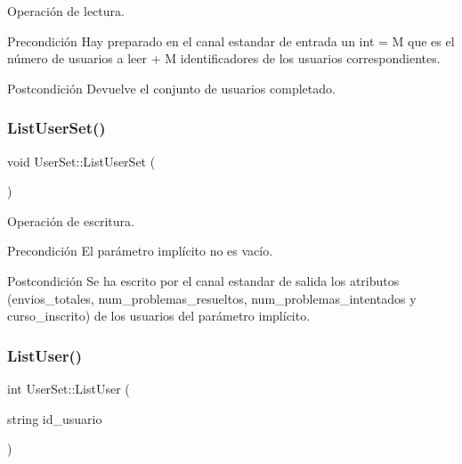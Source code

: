 Operación de lectura. 

\begin{DoxyPrecond}{Precondición}
Hay preparado en el canal estandar de entrada un int = M que es el número de usuarios a leer + M identificadores de los usuarios correspondientes. 
\end{DoxyPrecond}
\begin{DoxyPostcond}{Postcondición}
Devuelve el conjunto de usuarios completado. 
\end{DoxyPostcond}
\mbox{\label{class_user_set_a0d096b2eec4c9b5feb4a1d7c8e6d3ef6}} 
\subsubsection{\texorpdfstring{List\+User\+Set()}{ListUserSet()}}
{\footnotesize\ttfamily void User\+Set\+::\+List\+User\+Set (\begin{DoxyParamCaption}{ }\end{DoxyParamCaption})}



Operación de escritura. 

\begin{DoxyPrecond}{Precondición}
El parámetro implícito no es vacío. 
\end{DoxyPrecond}
\begin{DoxyPostcond}{Postcondición}
Se ha escrito por el canal estandar de salida los atributos (envios\+\_\+totales, num\+\_\+problemas\+\_\+resueltos, num\+\_\+problemas\+\_\+intentados y curso\+\_\+inscrito) de los usuarios del parámetro implícito. 
\end{DoxyPostcond}
\mbox{\label{class_user_set_a2087d9597ff9ce03ff471157040fac88}} 
\subsubsection{\texorpdfstring{List\+User()}{ListUser()}}
{\footnotesize\ttfamily int User\+Set\+::\+List\+User (\begin{DoxyParamCaption}\item[{string}]{id\+\_\+usuario }\end{DoxyParamCaption})}



